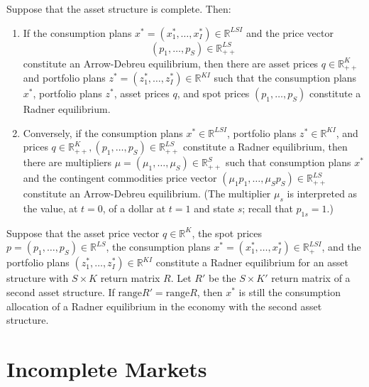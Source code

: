 \begin{prop}
    Suppose that the asset structure is complete. Then:
    \begin{enumerate}
        \item 
        If the consumption plans $x^* = (x^*_1, \dots, x^*_I) \in \mathbb{R}^{LSI}$ and the price vector 
        \begin{equation*}
            (p_1, \dots, p_S) \in \mathbb{R}^{LS}_{++}
        \end{equation*}
        constitute an Arrow-Debreu equilibrium, then there are asset prices $q \in \mathbb{R}^{K}_{++}$ and portfolio plans $z^* = (z^*_1, \dots, z^*_I) \in \mathbb{R}^{KI}$ such that the consumption plans $x^*$, portfolio plans $z^*$, asset prices $q$, and spot prices $(p_1, \dots, p_S)$ constitute a Radner equilibrium.

        \item 
        Conversely, if the consumption plans $x^* \in \mathbb{R}^{LSI}$, portfolio plans $z^* \in \mathbb{R}^{KI}$, and prices $q \in \mathbb{R}^{K}_{++}, (p_1, \dots, p_S) \in \mathbb{R}^{LS}_{++}$ constitute a Radner equilibrium, then there are multipliers $\mu = (\mu_1, \dots, \mu_S) \in \mathbb{R}^{S}_{++}$ such that consumption plans $x^*$ and the contingent commodities price vector $(\mu_1 p_1, \dots, \mu_S p_S) \in \mathbb{R}^{LS}_{++}$ constitute an Arrow-Debreu equilibrium. (The multiplier $\mu_s$ is interpreted as the value, at $t = 0$, of a dollar at $t = 1$ and state $s$; recall that $p_{1s} = 1$.)
    \end{enumerate}
\end{prop}

\begin{prop}
    Suppose that the asset price vector $q \in \mathbb{R}^{K}$, the spot prices $p = (p_{1}, \dots, p_{S}) \in \mathbb{R}^{LS}$, the consumption plans $x^* = (x^*_{1}, \dots, x^*_{I}) \in \mathbb{R}^{LSI}_+$, and the portfolio plans $(z^*_1, \dots, z^*_I) \in \mathbb{R}^{KI}$ constitute a Radner equilibrium for an asset structure with $S \times K$ return matrix $R$. Let $R'$ be the $S \times K'$ return matrix of a second asset structure. If $\text{range}R' = \text{range}R$, then $x^*$ is still the consumption allocation of a Radner equilibrium in the economy with the second asset structure.
\end{prop}


\section{Incomplete Markets}

